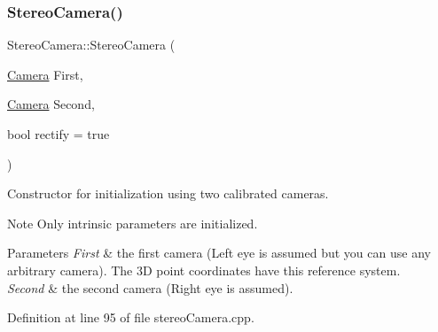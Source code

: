 \subsubsection{\texorpdfstring{StereoCamera()}{StereoCamera()}\hspace{0.1cm}{\footnotesize\ttfamily [3/3]}}
{\footnotesize\ttfamily Stereo\+Camera\+::\+Stereo\+Camera (\begin{DoxyParamCaption}\item[{\mbox{\hyperlink{classCamera}{Camera}}}]{First,  }\item[{\mbox{\hyperlink{classCamera}{Camera}}}]{Second,  }\item[{bool}]{rectify = {\ttfamily true} }\end{DoxyParamCaption})}



Constructor for initialization using two calibrated cameras. 

\begin{DoxyNote}{Note}
Only intrinsic parameters are initialized. 
\end{DoxyNote}

\begin{DoxyParams}{Parameters}
{\em First} & the first camera (Left eye is assumed but you can use any arbitrary camera). The 3D point coordinates have this reference system. \\
\hline
{\em Second} & the second camera (Right eye is assumed). \\
\hline
\end{DoxyParams}


Definition at line 95 of file stereo\+Camera.\+cpp.


\begin{DoxyCode}{0}

\end{DoxyCode}


